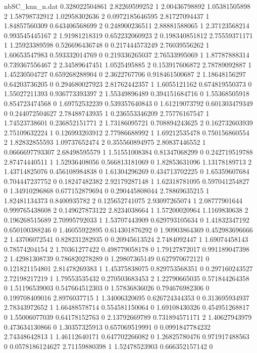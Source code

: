 \begin{filecontents}{nbSC_knn_n.dat}
0.328022504861 2.82269599252 1
2.00436798892 1.05381505898 2
1.58798732912 1.02958302636 2
0.0972185646595 2.81727094437 1
1.84857560309 0.643406568699 2
0.248900236511 2.88881588065 1
2.37123568214 0.993545445167 2
1.91981218319 0.652232060923 2
0.198340851812 2.75559371171 1
1.25923389598 0.526696436748 0
0.217444573249 2.76039556262 1
1.60653547983 0.593332014769 0
0.219336265037 2.76533995069 1
1.87787888314 0.739367556467 2
2.34589647451 1.0525495885 2
0.153917606872 2.78789092887 1
1.45230504727 0.659268288904 0
2.3622767706 0.918461500687 2
1.18648156297 0.64203736205 0
0.294680027923 2.81762442357 1
1.6055121162 0.674819550373 0
1.55027211393 0.936773393397 2
1.55349896489 0.394151684716 0
1.55368505918 0.854723474568 0
1.69752532239 0.539357640843 0
1.61219073792 0.601303479349 0
0.244072504627 2.78488743935 1
0.236553346209 2.75776167547 1
1.74523738601 0.236852151771 2
1.73186095721 0.708894243625 2
0.162732603939 2.75109632224 1
0.126993203912 2.77986688992 1
1.69212535478 0.750156860554 2
1.82832855593 1.09737652474 2
0.355560894975 2.80837446552 1
0.0666697793307 2.68498595579 1
1.51551008384 0.81347068299 0
0.242719519788 2.87474440511 1
1.52936408056 0.566813181069 0
1.82853631096 1.13178189713 2
1.43714825076 0.456108984838 0
1.61304296269 0.434713702225 0
1.65359607684 0.704447237752 0
0.18247482382 2.92179287148 1
1.62318781095 0.597041254827 0
1.34910296868 0.677152879694 0
0.290445808044 2.78869635215 1
1.82481134373 0.8400935782 2
0.125652741075 2.93097265074 1
2.08777901644 0.999765438608 2
0.149627873122 2.8234038664 1
1.57200020964 1.1169830638 2
0.196268515689 2.70995792033 1
1.53707443909 0.629793105634 0
1.41832347192 0.650100388246 0
1.46055922895 0.614301876292 0
1.90903864369 0.452983696666 2
1.43706072541 0.828231282935 0
0.20945613524 2.7484092447 1
1.69074458143 0.78574204154 2
1.70361277422 0.498779058178 0
1.79127872017 0.991189047398 2
1.42981308739 0.786820278289 0
1.29807365149 0.627970672121 0
0.121821154801 2.81478269383 1
1.45375838075 0.829753568351 0
0.297160243527 2.72198217219 1
1.79553535432 0.270503683453 2
1.22790665035 0.571844264358 0
1.51196539003 0.547664512303 0
1.57836836026 0.794676982306 0
0.199708409016 2.8976037715 1
1.34006320695 0.626724344353 0
0.313695934937 2.78343972652 1
1.66488578714 0.554581150064 0
1.69108430326 0.454951268817 0
1.55006077039 0.64178152763 0
2.13792669789 0.731894571171 2
1.40627943979 0.473634130866 0
1.30357325913 0.657069519991 0
0.0991847784232 2.74348642813 1
1.46112640171 0.647702266082 0
1.26825780476 0.971917488563 0
0.0578186124627 2.71159880398 1
1.52478523903 0.666352157142 0

\end{filecontents}
